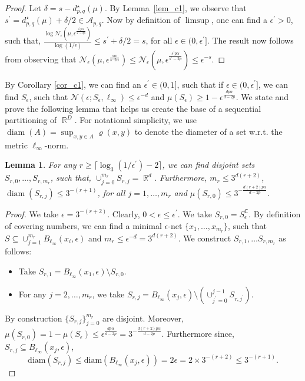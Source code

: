 \documentclass[12pts]{article}
\newtheorem{lemma}[defn]{Lemma}%
\def\Real{\mathop{\mathbb{R}}\nolimits}
\newcommand{\cN}{ \mathcal{N}}
\newcommand{\sA}{ \mathscr{A}}
\newcommand{\sN}{ \mathscr{N}}
\begin{document}
 \begin{proof}
    Let $\delta = s - d^\star_{p,q}(\mu)$.  By Lemma~\ref{lem_c1}, we observe that  $s^\prime = d^\star_{p,q}(\mu) + \delta/2 \in \sA_{p,q}.$ Now by definition of $\limsup$, one can find a $\epsilon^\prime>0$, such that, $\frac{\log \sN_\epsilon\left(\mu, \epsilon^{\frac{s^\prime p \alpha}{s^\prime-2p}}\right)}{\log(1/\epsilon)} \le s^\prime + \delta/2 = s $, for all $\epsilon \in (0, \epsilon^\prime]$. The result now follows from observing that $\sN_\epsilon\left(\mu, \epsilon^{\frac{s \alpha}{s^-2\alpha}}\right) \le \sN_\epsilon\left(\mu, \epsilon^{\frac{s^\prime p \alpha}{s^\prime-2p}}\right) \le \epsilon^{-s}$.
 \end{proof}

 By Corollary \ref{cor_c1}, we can find an $\epsilon^\prime \in (0,1]$, such that if $\epsilon \in (0, \epsilon^\prime]$, we can find $S_\epsilon$, such that $\cN(\epsilon; S_\epsilon, \ell_\infty) \le \epsilon^{-d} $ and $\mu(S_\epsilon) \ge 1 - \epsilon^{\frac{d p \alpha}{d-2p}}$. We state and prove the following lemma that helps us create the base of a sequential partitioning of $\Real^D$. For notational simplicity, we use $\operatorname{diam}(A) = \sup_{x,y \in A} \varrho(x,y)$ to denote the diameter of a set w.r.t. the metric $\ell_\infty$-norm. 

\begin{lemma}\label{lem_c2}
    For any $r \ge \lceil \log_3(1/\epsilon^\prime) -2\rceil$, we can find disjoint sets  $S_{r,0},\dots,S_{r, m_r}$, such that, $\cup_{j=0}^{m_r} S_{r,j} = \Real^d$. Furthermore, $m_r \le 3^{d (r+2)}$, $\operatorname{diam}(S_{r,j})  \le 3^{-(r+1)}$, for all $j=1, \dots ,m_r$ and $\mu(S_{r,0}) \le 3^{-\frac{d(r+2) p \alpha }{d-2p}}$.
\end{lemma}
\begin{proof}
    We take $\epsilon = 3^{-(r+2)}$. Clearly, $0< \epsilon \le \epsilon^\prime$. We take $S_{r,0} = S_\epsilon^\mathsf{C}$. By definition of covering numbers, we can find a minimal $\epsilon$-net $\{x_1, \dots, x_{m_r}\}$, such that $S \subseteq\cup_{j=1}^{m_r} B_{\ell_\infty}(x_i, \epsilon)$ and $m_r \le \epsilon^{-d} = 3^{d(r+2)}$. We construct $S_{r,1}, \dots S_{r,m_r}$ as follows:
    \begin{itemize}
        \item Take $S_{r,1} = B_{\ell_\infty}(x_1, \epsilon) \setminus S_{r,0}$.
        \item For any $j =2,\dots, m_r$, we take $S_{r,j} = B_{\ell_\infty}(x_j, \epsilon) \setminus \left(\cup_{j^\prime=0}^{j-1} S_{r,j^\prime}\right)$.
    \end{itemize}
    By construction $\{S_{r,j}\}_{j=0}^{m_r}$ are disjoint. Moreover, $\mu(S_{r,0}) = 1 - \mu(S_\epsilon) \le \epsilon^{\frac{d p \alpha }{d - 2 p}} = 3^{-\frac{d(r+2) p \alpha }{d-2p}}$. Furthermore since, $S_{r,j} \subseteq B_{\ell_\infty}(x_j, \epsilon)$, \[\text{diam}(S_{r,j}) \le \text{diam}(B_{\ell_\infty}(x_j, \epsilon)) = 2 \epsilon = 2 \times 3^{-(r+2)} \le 3^{-(r+1)}.\]
\end{proof}
\end{document}

